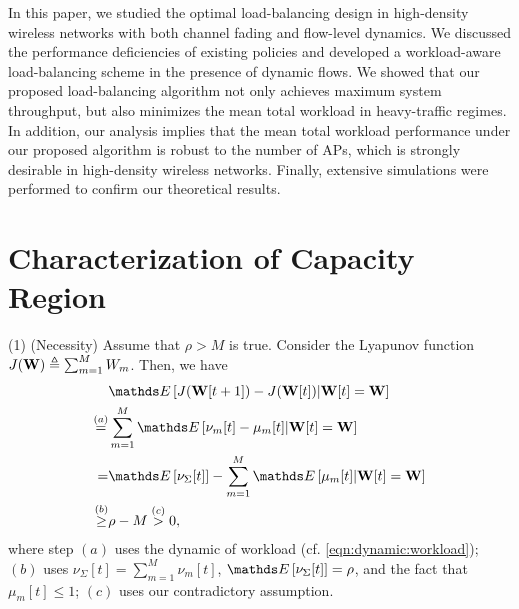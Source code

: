 \documentclass[10pt, conference, letterpaper]{IEEEtran} %
\begin{document}
In this paper, we studied the optimal load-balancing design in high-density wireless networks with both channel fading and flow-level dynamics. We discussed the performance deficiencies of existing policies and developed a workload-aware load-balancing scheme in the presence of dynamic flows. We showed that our proposed load-balancing algorithm not only achieves maximum system throughput, but also minimizes the mean total workload in heavy-traffic regimes. In addition, our analysis implies that the mean total workload performance under our proposed algorithm is robust to the number of APs, which is strongly desirable in high-density wireless networks. Finally, extensive simulations were performed to confirm our theoretical results.



\appendices


\section{Characterization of Capacity Region}
\label{APP:capacity}
%
(1) (Necessity) Assume that $\rho>M$ is true. Consider the Lyapunov function $J(\mathbf{W})\triangleq\sum_{m=1}^{M}W_m$. Then, we have 
\begin{align}
&\bE\left[J(\mb{W}[t+1])-J(\mb{W}[t])\middle|\mb{W}[t]=\mb{W}\right] \nonumber\\
\stackrel{(a)}{=}&\sum_{m=1}^{M}\bE\left[\nu_m[t]-\mu_m[t]\middle|\mb{W}[t]=\mb{W}\right] \nonumber\\
=&\bE\left[\nu_{\Sigma}[t]\right]-\sum_{m=1}^{M}\bE\left[\mu_m[t]\middle|\mb{W}[t]=\mb{W}\right] \nonumber\\
\stackrel{(b)}{\geq}&\rho-M\stackrel{(c)}{>}0,
\end{align}
where step $(a)$ uses the dynamic of workload (cf. \eqref{eqn:dynamic:workload}); $(b)$ uses $\nu_{\Sigma}[t]=\sum_{m=1}^{M}\nu_m[t]$, $\bE\left[\nu_{\Sigma}[t]\right]=\rho$, and the fact that $\mu_m[t]\leq1$; $(c)$ uses our contradictory assumption. 
\end{document}
